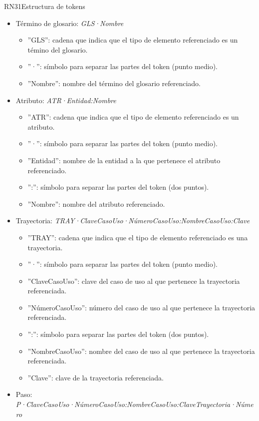 \begin{BussinesRule}{RN31}{Estructura de tokens}
\begin{itemize}
	\item Término de glosario: {\em GLS·Nombre}
		\begin{itemize}
			\item ''GLS'': cadena que indica que el tipo de elemento referenciado es un témino del glosario.
			\item ''·'':  símbolo para separar las partes del token (punto medio).
			\item ''Nombre'': nombre del término del glosario referenciado.
		\end{itemize}
	\item Atributo: {\em ATR·Entidad:Nombre}
		\begin{itemize}
			\item ''ATR'': cadena que indica que el tipo de elemento referenciado es un atributo.
			\item ''·'':  símbolo para separar las partes del token (punto medio).
			\item ''Entidad'': nombre de la entidad a la que pertenece el atributo referenciado.
			\item '':'': símbolo para separar las partes del token (dos puntos).
			\item ''Nombre'': nombre del atributo referenciado.
		\end{itemize}
	\item Trayectoria: {\em TRAY·ClaveCasoUso·NúmeroCasoUso:NombreCasoUso:Clave}
		\begin{itemize}
			\item ''TRAY'': cadena que indica que el tipo de elemento referenciado es una trayectoria.
			\item ''·'':  símbolo para separar las partes del token (punto medio).
			\item ''ClaveCasoUso'': clave del caso de uso al que pertenece la trayectoria referenciada.
			\item ''NúmeroCasoUso'': número del caso de uso al que pertenece la trayectoria referenciada.
			\item '':'': símbolo para separar las partes del token (dos puntos).
			\item ''NombreCasoUso'': nombre del caso de uso al que pertenece la trayectoria referenciada.
			\item ''Clave'': clave de la trayectoria referenciada.
		\end{itemize}
	\item Paso: {\em P·ClaveCasoUso·NúmeroCasoUso:NombreCasoUso:ClaveTrayectoria·Número}
		\begin{itemize}

\end{itemize}
\end{itemize}
\end{BussinesRule}
